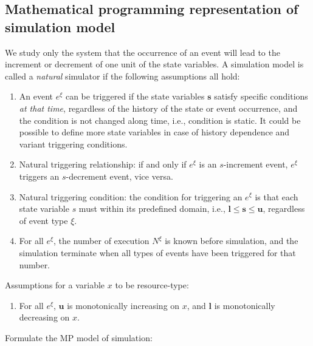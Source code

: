 \documentclass[]{interact}
\theoremstyle{plain}%
\theoremstyle{definition}
\theoremstyle{remark}
\begin{document}
\subsection{Mathematical programming representation of simulation model}
We study only the system that the occurrence of an event will lead to the increment or decrement of one unit of the state variables. A simulation model is called a \textit{natural} simulator if the following assumptions all hold:
\begin{enumerate}
		\item An event $e^{\xi}$ can be triggered if the state variables $\mathbf{s}$ satisfy specific conditions \textit{at that time}, regardless of the history of the state or event occurrence, and the condition is not changed along time, i.e., condition is static. It could be possible to define more state variables in case of history dependence and variant triggering conditions.
		\item Natural triggering relationship: if and only if $e^{\xi}$ is an $s$-increment event, $e^{\xi}$ triggers an $s$-decrement event, vice versa.
		\item Natural triggering condition: the condition for triggering an $e^{\xi}$ is that each state variable $s$ must within its predefined domain, i.e., $\mathbf{l} \le\mathbf{s}\le \mathbf{u}$, regardless of event type $\xi$.
		\item For all $e^{\xi}$, the number of execution $N^{\xi}$ is known before simulation, and the simulation terminate when all types of events have been triggered for that number.
\end{enumerate}

Assumptions for a variable $x$ to be resource-type:
\begin{enumerate}
	\item For all $e^{\xi}$, $\mathbf{u}$ is monotonically increasing on $x$, and $\mathbf{l}$ is monotonically decreasing on $x$.
\end{enumerate}

Formulate the MP model of simulation:
\end{document}
